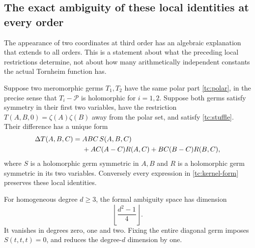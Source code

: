 \subsection{The exact ambiguity of these local identities at every order}

The appearance of two coordinates at third order has an algebraic
explanation that extends to all orders.  This is a statement about
what the preceding local restrictions determine, not about how many
arithmetically independent constants the actual Tornheim function has.

\begin{theorem}
\label{tc:kernel}
Suppose two meromorphic germs $T_1,T_2$ have the same polar part
\eqref{tc:polar}, in the precise sense that $T_i-\mathscr P$ is
holomorphic for $i=1,2$. Suppose both germs satisfy symmetry in their first two variables, have
the restriction $T(A,B,0)=\zeta(A)\zeta(B)$ away from the polar set,
and satisfy \eqref{tc:stuffle}.  Their difference has a unique form
\begin{align}
 \Delta T(A,B,C)={}&ABC\,S(A,B,C)\notag\\
 &+AC(A-C)R(A,C)+BC(B-C)R(B,C),
 \label{tc:kernel-form}
\end{align}
where $S$ is a holomorphic germ symmetric in $A,B$ and $R$ is a
holomorphic germ symmetric in its two variables.  Conversely every
expression in \eqref{tc:kernel-form} preserves these local identities.

For homogeneous degree $d\ge3$, the formal ambiguity space has
dimension
\begin{equation}
 \left\lfloor\frac{d^2-1}{4}\right\rfloor.
 \label{tc:kernel-dimension}
\end{equation}
It vanishes in degrees zero, one and two.  Fixing the entire diagonal
germ imposes $S(t,t,t)=0$, and reduces the degree-$d$ dimension by one.
\end{theorem}

